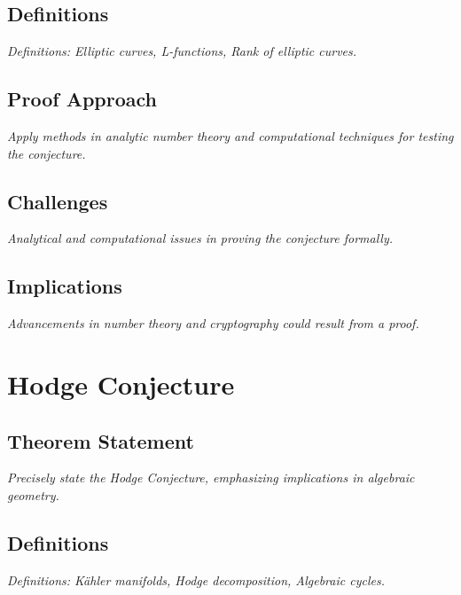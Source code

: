 \documentclass[12pt, a4paper]{article}
\begin{document}
\subsection{Definitions}
\textit{Definitions: Elliptic curves, L-functions, Rank of elliptic curves.}

\subsection{Proof Approach}
\textit{Apply methods in analytic number theory and computational techniques for testing the conjecture.}

\subsection{Challenges}
\textit{Analytical and computational issues in proving the conjecture formally.}

\subsection{Implications}
\textit{Advancements in number theory and cryptography could result from a proof.}


\section{Hodge Conjecture}
\subsection{Theorem Statement}
\begin{theorem}
\label{thm:hodge}
\textit{Precisely state the Hodge Conjecture, emphasizing implications in algebraic geometry.}
\end{theorem}

\subsection{Definitions}
\textit{Definitions: Kähler manifolds, Hodge decomposition, Algebraic cycles.}
\end{document}

